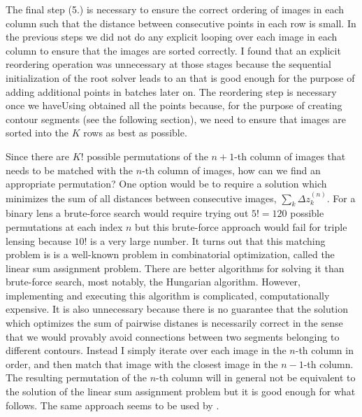 \documentclass[12pt,dvipsnames]{report}
\newcommand{\ssf}[1]{\textsf{#1}}
\begin{document}
The final step (5.) is necessary to ensure the correct ordering of images in each column 
such that the distance between consecutive points in each row is small. 
In the previous steps we did not do any explicit looping over each image in each column to 
ensure that the images are sorted correctly. I found that an explicit reordering operation was 
unnecessary at those stages because the sequential initialization of the root solver leads to 
an that is good enough for the purpose of adding additional points in batches later on. 
The reordering step is necessary once we haveUsing  obtained all the points 
because, for the purpose of creating contour segments (see the following section), 
we need to ensure that images are sorted into the $K$ rows as best as possible. 

Since there are $K!$ possible permutations of the $n+1$-th column of images that needs to 
be matched with the $n$-th column of images, how can we find an appropriate permutation? 
One option  would be to require a solution which minimizes the sum of all distances 
between consecutive images, $\sum_k \Delta z^{(n)}_k$.
For a binary lens a brute-force search would require trying out $5!=120$ possible permutations 
at each index $n$ but this brute-force approach would fail for triple lensing because 
$10!$ is a very large number. It turns out that this matching problem is is a well-known problem 
in combinatorial optimization, called the \ssf{linear sum assignment problem}. There are better
algorithms for solving it than brute-force search, most notably, the 
\ssf{Hungarian algorithm}. However, implementing and executing this algorithm is complicated, 
computationally expensive. It is also unnecessary because there is no guarantee that 
the solution which optimizes the sum of pairwise distanes is necessarily correct in the sense 
that we would provably avoid connections between two segments belonging to different contours.
Instead I simply iterate over each image in the $n$-th column in order, and then match that 
image with the closest image in  the $n-1$-th column.  The resulting permutation of the 
$n$-th column will in general not be equivalent to the solution 
of the linear sum assignment problem but it is good enough for what follows.
The same approach seems to be used by \citet{2021MNRAS.503.6143K}.
\end{document}
